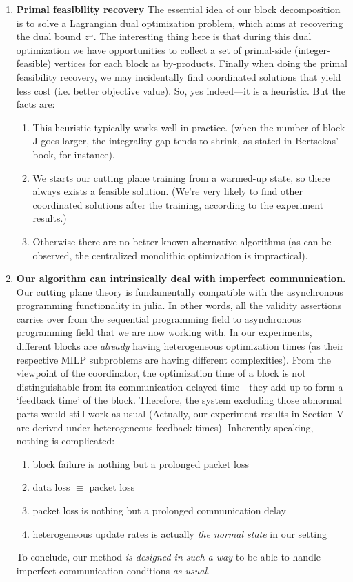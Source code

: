 \documentclass[11pt]{article}
\begin{document}
\begin{enumerate}
    \item \textbf{Primal feasibility recovery} \label{primalfeas} The essential idea of our block decomposition is to solve a Lagrangian dual optimization problem, which aims at recovering the dual bound $z^\textrm{L}$. The interesting thing here is that during this dual optimization we have opportunities to collect a set of primal-side (integer-feasible) vertices for each block as by-products. Finally when doing the primal feasibility recovery, we may incidentally find coordinated solutions that yield less cost (i.e. better objective value). So, yes indeed---it is a heuristic. But the facts are:
    \begin{enumerate}
        \item This heuristic typically works well in practice. (when the number of block $\mathrm{J}$ goes larger, the integrality gap tends to shrink, as stated in Bertsekas' book, for instance).
        \item We starts our cutting plane training from a warmed-up state, so there always exists a feasible solution. (We're very likely to find other coordinated solutions after the training, according to the experiment results.)
        \item Otherwise there are no better known alternative algorithms (as can be observed, the centralized monolithic optimization is impractical).
    \end{enumerate}

    \item \textbf{Our algorithm can intrinsically deal with imperfect communication.}
    \label{imperfectcommunication} Our cutting plane theory is fundamentally compatible with
    the asynchronous programming functionality in julia. 
    In other words, all the validity assertions carries over from the sequential programming
    field to asynchronous programming field that we are now working with.
    In our experiments, different blocks are \textit{already} having heterogeneous optimization times (as their respective MILP subproblems are having different complexities).
    From the viewpoint of the coordinator, the optimization time of a block is not distinguishable from its communication-delayed time---they add up to form a `feedback time' of the block.
    Therefore, the system excluding those abnormal parts would still work as usual (Actually, our experiment results in Section V are derived under heterogeneous feedback times).
    Inherently speaking, nothing is complicated:\begin{enumerate}
        \item block failure is nothing but a prolonged packet loss 
        \item data loss $\equiv$ packet loss
        \item packet loss is nothing but a prolonged communication delay
        \item heterogeneous update rates is actually \textit{the normal state} in our setting
    \end{enumerate}
    To conclude, our method \textit{is designed in such a way} to be able to handle imperfect communication conditions \textit{as usual}.
    
\end{enumerate}
\end{document}
